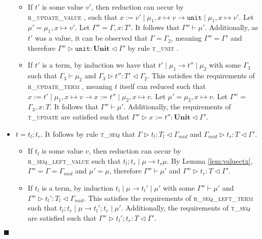 \documentclass{article}
\newcommand{\lemref}[1]{Lemma \ref{#1}}
\newcommand{\rupdt}{\textsc{r\_update\_term} }
\newcommand{\rupdv}{\textsc{r\_update\_value} }
\newcommand{\rseqlt}{\textsc{r\_seq\_left\_term} }
\newcommand{\rseqlv}{\textsc{r\_seq\_left\_value} }
\newcommand{\tunit}{\textsc{t\_unit} }
\newcommand{\tupd}{\textsc{t\_update} }
\newcommand{\tseq}{\textsc{t\_seq} }
\newcommand{\typerule}[4]{#1 \triangleright #2 : #3 \triangleleft #4}
\newcommand{\unitv}{\mathtt{unit}}
\newcommand{\unitt}{\mathbf{Unit}}
\newcommand{\qed}{$\blacksquare$}
\newenvironment{proof}{\vspace{1ex}\noindent{\bf Proof}\hspace{0.5em}}
  {\hfill\qed\vspace{1ex}}
\begin{document}
\begin{proof}
\begin{itemize}
	\begin{itemize}
	\item If $t'$ is some value $v'$, 
	then reduction can occur by \\
	\rupdv, such that 
	$x := v' \mid \mu_1, x \mapsto v \longrightarrow \unitv \mid \mu_1 , x \mapsto v'$.
	Let $\mu' = \mu_1, x \mapsto v'$. Let $\Gamma'' = \Gamma, x : T'$.
	It follows that $\Gamma'' \vdash \mu'$. Additionally, as $t'$ was a value,
	it can be observed that $\Gamma = \Gamma_2$, meaning $\Gamma'' = \Gamma'$
	and therefore
	$\typerule{\Gamma''}{\unitv}{\unitt}{\Gamma'}$ by rule
	\tunit.

	\item If $t'$ is a term, 
	by induction we have that $t' \mid \mu_1 \longrightarrow t'' \mid \mu_2$
	with some $\Gamma_3$ such that $\Gamma_3 \vdash \mu_2$ and
	$\typerule{\Gamma_3}{t''}{T'}{\Gamma_2}$.
	This satisfies the requirements of \rupdt, meaning $t$ itself can reduced
	such that $x := t' \mid \mu_1, x \mapsto v \longrightarrow x := t'' \mid \mu_2, x \mapsto v$.
	Let $\mu' = \mu_2, x \mapsto v$. Let $\Gamma''$ = $\Gamma_3, x : T$.
	It follows that $\Gamma'' \vdash \mu'$. 
	Additionally, the requirements of \tupd are satisfied such that
	$\typerule{\Gamma''}{x := t''}{\unitt}{\Gamma'}$.
	\end{itemize}

\item $t = t_l ; t_r$. It follows by rule
\tseq that $\typerule{\Gamma}{t_l}{T_l}{\Gamma_{mid}}$ and
$\typerule{\Gamma_{mid}}{t_r}{T}{\Gamma'}$.

	\begin{itemize}
	\item If $t_l$ is some value $v$, then
	reduction can occur by \\ 
	\rseqlv such that
	$t_l; t_r \mid \mu \longrightarrow t_r \mu$. By \lemref{lem:valuectx}, 
	$\Gamma'' = \Gamma = \Gamma_{mid}$
	and $\mu' = \mu$, therefore $\Gamma'' \vdash \mu'$ and 
	$\typerule{\Gamma''}{t_r}{T}{\Gamma'}$.

	\item If $t_l$ is a term, by induction $t_l \mid \mu \longrightarrow t_l' \mid \mu'$
	with some $\Gamma'' \vdash \mu'$ and
	$\typerule{\Gamma''}{t_l'}{T_l}{\Gamma_{mid}}$.
	This satisfies the requirements of \rseqlt
	such that $t_l; t_r \mid \mu \longrightarrow t_l'; t_r \mid \mu'$.
	Additionally, the requirements of \tseq are satisfied such that
	$\typerule{\Gamma''}{t_l'; t_r}{T}{\Gamma'}$.

	\end{itemize}


\end{itemize}
\end{proof}
\end{document}

